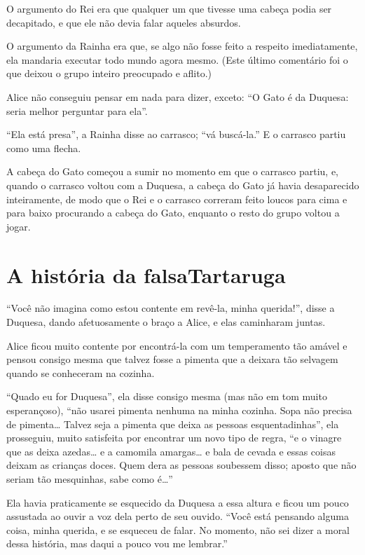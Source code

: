 O argumento do Rei era que qualquer um que tivesse uma cabeça podia ser
decapitado, e que ele não devia falar aqueles absurdos.

O argumento da Rainha era que, se algo não fosse feito a respeito
imediatamente, ela mandaria executar todo mundo agora mesmo. (Este
último comentário foi o que deixou o grupo inteiro preocupado e aflito.)

Alice não conseguiu pensar em nada para dizer, exceto: ``O Gato é da
Duquesa: seria melhor perguntar para ela''.

``Ela está presa'', a Rainha disse ao carrasco; ``vá buscá-la.'' E o
carrasco partiu como uma flecha.

A cabeça do Gato começou a sumir no momento em que o carrasco partiu, e,
quando o carrasco voltou com a Duquesa, a cabeça do Gato já havia
desaparecido inteiramente, de modo que o Rei e o carrasco correram feito
loucos para cima e para baixo procurando a cabeça do Gato, enquanto o
resto do grupo voltou a jogar.

\quebra\chapter[A história da falsa Tartaruga]{A história da falsa\break Tartaruga}

``Você não imagina como estou contente em revê-la, minha querida!'',
disse a Duquesa, dando afetuosamente o braço a Alice, e elas caminharam
juntas.

Alice ficou muito contente por encontrá-la com um temperamento tão
amável e pensou consigo mesma que talvez fosse a pimenta que a deixara
tão selvagem quando se conheceram na cozinha.

``Quado eu for Duquesa'', ela disse consigo mesma (mas não em tom muito
esperançoso), ``não usarei pimenta nenhuma na minha cozinha. Sopa não
precisa de pimenta\ldots{} Talvez seja a pimenta que deixa as pessoas
esquentadinhas'', ela prosseguiu, muito satisfeita por encontrar um novo
tipo de regra, ``e o vinagre que as deixa azedas\ldots{} e a camomila
amargas\ldots{} e bala de cevada e essas coisas deixam as crianças doces.
Quem dera as pessoas soubessem disso; aposto que não seriam tão
mesquinhas, sabe como é\ldots{}''

Ela havia praticamente se esquecido da Duquesa a essa altura e ficou um
pouco assustada ao ouvir a voz dela perto de seu ouvido. ``Você está
pensando alguma coisa, minha querida, e se esqueceu de falar. No
momento, não sei dizer a moral dessa história, mas daqui a pouco vou me
lembrar.''

